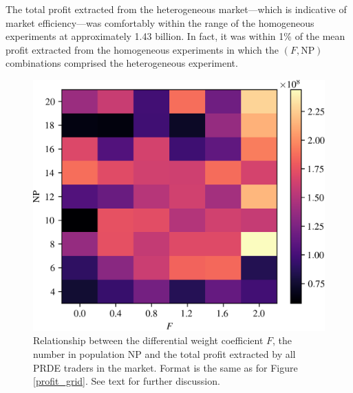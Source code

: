 \documentclass[conference]{IEEEtran}
\begin{document}
The total profit extracted from the heterogeneous market---which is indicative of market efficiency---was comfortably within the range of the homogeneous experiments at approximately 1.43 billion.
In fact, it was within 1\% of the mean profit extracted from the homogeneous experiments in which the $(F,\mathrm{NP})$ combinations comprised the heterogeneous experiment.

\begin{figure}[htbp]
    \centerline{\includegraphics[width=\columnwidth]{zip_profit_grid.png}}
    \caption{
        Relationship between the differential weight coefficient $F$, the number in population $\mathrm{NP}$ and the total profit extracted by all PRDE traders in the market.
        Format is the same as for Figure \ref{profit_grid}.
        See text for further discussion.
    }
    \label{zip}
\end{figure}
\end{document}
